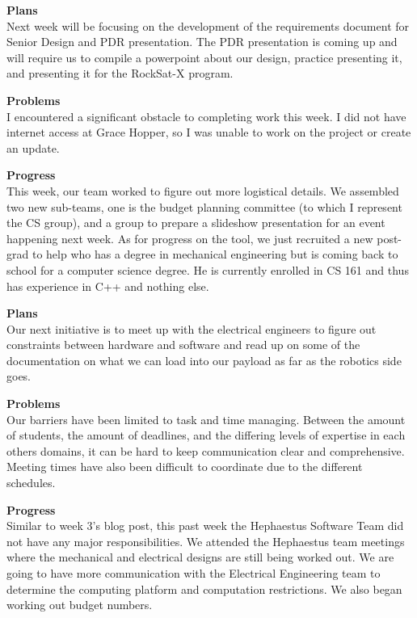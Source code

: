 \textbf{Plans} \\
Next week will be focusing on the development of the requirements document for Senior Design and PDR presentation. The PDR presentation is coming up and will require us to compile a powerpoint about our design, practice presenting it, and presenting it for the RockSat-X program.

\textbf{Problems} \\
I encountered a significant obstacle to completing work this week. I did not have internet access at Grace Hopper, so I was unable to work on the project or create an update.

\textbf{Progress} \\
This week, our team worked to figure out more logistical details. We assembled two new sub-teams, one is the budget 
planning committee (to which I represent the CS group), and a group to prepare a slideshow presentation for an event 
happening next week. As for progress on the tool, we just recruited a new post-grad to help who has a degree in 
mechanical engineering but is coming back to school for a computer science degree. He is currently enrolled in CS 161 
and thus has experience in C++ and nothing else. 

\textbf{Plans} \\
Our next initiative is to meet up with the electrical engineers to figure out constraints between hardware and 
software and read up on some of the documentation on what we can load into our payload as far as the robotics side 
goes.

\textbf{Problems} \\
Our barriers have been limited to task and time managing. Between the amount of students, the amount of deadlines, and 
the differing levels of expertise in each others domains, it can be hard to keep communication clear and comprehensive.
Meeting times have also been difficult to coordinate due to the different schedules.

\textbf{Progress} \\
Similar to week 3's blog post, this past week the Hephaestus Software Team did not have any major responsibilities. We attended the Hephaestus team meetings where the mechanical and electrical designs are still being worked out. We are going to have more communication with the Electrical Engineering team to determine the computing platform and computation restrictions. We also began working out budget numbers.

